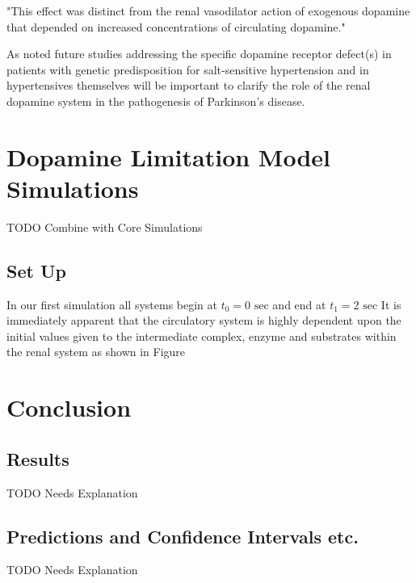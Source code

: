 \documentclass[smallextended]{svjour3}
\newcommand{\todo}[1]{{\huge\color{red}TODO {#1}}}
\begin{document}
"This effect was distinct from the renal vasodilator action of exogenous dopamine that depended on increased concentrations of circulating dopamine." \cite{Ref32}

As noted future studies addressing the specific dopamine receptor defect(s) in patients with genetic predisposition for salt-sensitive hypertension and in hypertensives themselves will be important to clarify the role of the renal dopamine system in the pathogenesis of \cite{Ref16} Parkinson's disease. 

\section{Dopamine Limitation Model Simulations}
\label{sec:7}
\todo{Combine with Core Simulations}
\subsection{Set Up}
 
 In our first simulation all systems begin at $t_0 = 0 \text{ sec}$ and end at $t_1 = 2 \text{ sec}$  It is immediately apparent that the circulatory system is highly dependent upon the initial values given to the intermediate complex, enzyme and substrates within the renal system as shown in Figure 

\section{Conclusion}
\label{sec:8}
\subsection{Results}
\todo{ Needs Explanation }
\subsection{Predictions and Confidence Intervals etc.}       %
\todo{ Needs Explanation }
\end{document}
